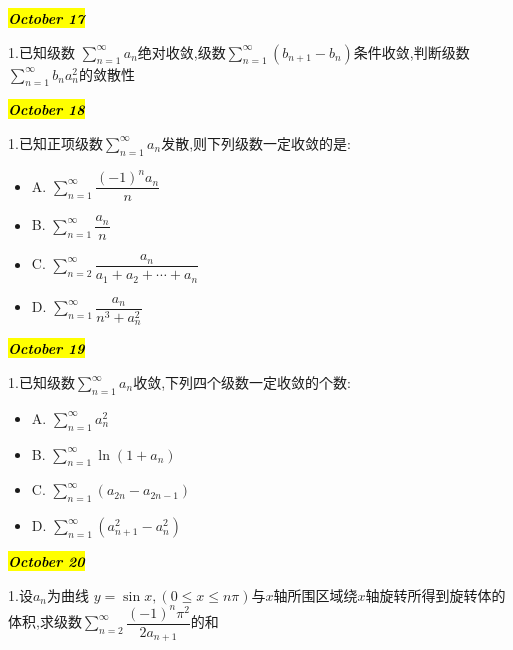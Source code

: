 \hl{\textbf{\textit{October 17}}}

1.已知级数 $\sum\limits_{n=1}^{\infty}a_{n}$绝对收敛,级数$\sum\limits_{n=1}^{\infty}(b_{n+1}-b_{n})$条件收敛,判断级数$\sum\limits_{n=1}^{\infty}b_{n}a_{n}^{2}$的敛散性
\begin{solution}
	
\end{solution}
 
\hl{\textbf{\textit{October 18}}}

1.已知正项级数$\sum\limits_{n=1}^{\infty}a_{n}$发散,则下列级数一定收敛的是:
\begin{itemize}
	\item A. $\sum\limits_{n=1}^{\infty}\dfrac{(-1)^{n}a_{n}}{n}$
	\item B. $\sum\limits_{n=1}^{\infty}\dfrac{a_{n}}{n}$
	\item C. $\sum\limits_{n=2}^{\infty}\dfrac{a_{n}}{a_{1}+a_{2}+\cdots+a_{n}}$
	\item D. $\sum\limits_{n=1}^{\infty}\dfrac{a_{n}}{n^{3}+a_{n}^{2}}$
\end{itemize}
\begin{solution}
	
\end{solution}

\hl{\textbf{\textit{October 19}}}

1.已知级数$\sum\limits_{n=1}^{\infty}a_{n}$收敛,下列四个级数一定收敛的个数:
\begin{itemize}
	\item A. $\sum\limits_{n=1}^{\infty}a_{n}^{2}$
	\item B. $\sum\limits_{n=1}^{\infty}\ln(1+a_{n})$
	\item C. $\sum\limits_{n=1}^{\infty}(a_{2n}-a_{2n-1})$
	\item D. $\sum\limits_{n=1}^{\infty}(a_{n+1}^{2}-a_{n}^{2})$
\end{itemize}
\begin{solution}
	
\end{solution}

\hl{\textbf{\textit{October 20}}}

1.设$a_{n}$为曲线 $y=\sin x,(0\leq x\leq n\pi)$与$x$轴所围区域绕$x$轴旋转所得到旋转体的体积,求级数$\sum\limits_{n=2}^{\infty}\dfrac{(-1)^{n}\pi^{2}}{2a_{n+1}}$的和
\begin{solution}
	
\end{solution}


